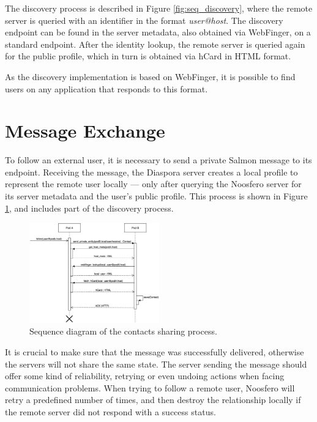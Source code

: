 The discovery process is described in Figure \ref{fig:seq_discovery},
where the remote server is queried with an identifier in the format
\textit{user@host}. The discovery endpoint can be found in the server
metadata, also obtained via WebFinger, on a standard endpoint. After the
identity lookup, the remote server is queried again for the public
profile, which in turn is obtained via hCard in HTML format.

As the discovery implementation is based on WebFinger, it is possible to
find users on any application that responds to this format.

\section{Message Exchange}

To follow an external user, it is necessary to send a private Salmon
message to its endpoint. Receiving the message, the Diaspora server
creates a local profile to represent the remote user locally --- only
after querying the Noosfero server for its server metadata and the
user's public profile. This process is shown in Figure
\ref{fig:seq_contact}, and includes part of the discovery process.

\begin{figure}[h]
	\centering
		\includegraphics[width=0.5\textwidth]{figures/seq_contato.eps}
	\caption{Sequence diagram of the contacts sharing process.}
	\label{fig:seq_contact}
\end{figure}

It is crucial to make sure that the message was successfully delivered,
otherwise the servers will not share the same state. The server sending
the message should offer some kind of reliability, retrying or even
undoing actions when facing communication problems. When trying to
follow a remote user, Noosfero will retry a predefined number of times,
and then destroy the relationship locally if the remote server did not
respond with a success status.

